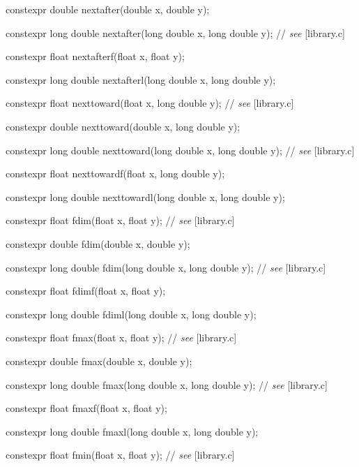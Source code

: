 \documentclass[prd,twocolumn,amsmath,amssymb,nofootinbib,eqsecnum]{revtex4-1}
\newcommand{\highlight}[1]{{\color{green} #1}}
\newcommand{\stdcomment}[1]{{// {\it see} [#1]}}
\begin{document}
{\highlight{constexpr}  double nextafter(double x, double y);

\highlight{constexpr}  long double nextafter(long double x, long double y); \stdcomment{library.c}

\highlight{constexpr}  float nextafterf(float x, float y);

\highlight{constexpr}  long double nextafterl(long double x, long double y);

\vspace{2ex}

\highlight{constexpr}  float nexttoward(float x, long double y); \stdcomment{library.c}

\highlight{constexpr}  double nexttoward(double x, long double y);

\highlight{constexpr}  long double nexttoward(long double x, long double y); \stdcomment{library.c}

\highlight{constexpr}  float nexttowardf(float x, long double y);

\highlight{constexpr}  long double nexttowardl(long double x, long double y);

\vspace{2ex}

\highlight{constexpr}  float fdim(float x, float y); \stdcomment{library.c}

\highlight{constexpr}  double fdim(double x, double y);

\highlight{constexpr}  long double fdim(long double x, long double y); \stdcomment{library.c}

\highlight{constexpr}  float fdimf(float x, float y);

\highlight{constexpr}  long double fdiml(long double x, long double y);

\vspace{2ex}

\highlight{constexpr}  float fmax(float x, float y); \stdcomment{library.c}

\highlight{constexpr}  double fmax(double x, double y);

\highlight{constexpr}  long double fmax(long double x, long double y); \stdcomment{library.c}

\highlight{constexpr}  float fmaxf(float x, float y);

\highlight{constexpr}  long double fmaxl(long double x, long double y);

\vspace{2ex}

\highlight{constexpr} float fmin(float x, float y); \stdcomment{library.c}

}
\end{document}
